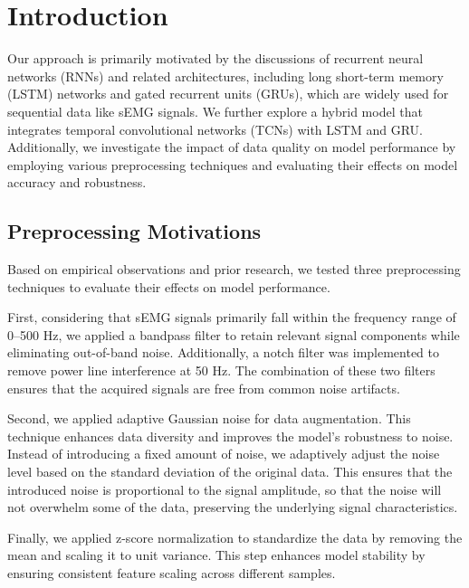 
\section{Introduction}
Our approach is primarily motivated by the discussions of recurrent neural networks (RNNs) and related architectures, 
including long short-term memory (LSTM) networks and gated recurrent units (GRUs), 
which are widely used for sequential data like sEMG signals. 
We further explore a hybrid model that integrates temporal convolutional networks (TCNs) with LSTM and GRU. 
Additionally, we investigate the impact of data quality on model performance by employing various preprocessing techniques 
and evaluating their effects on model accuracy and robustness.

\subsection{Preprocessing Motivations}
Based on empirical observations and prior research, 
we tested three preprocessing techniques to evaluate their effects on model performance.

First, considering that sEMG signals primarily fall within the frequency range of 0--500 Hz, 
we applied a bandpass filter to retain relevant signal components while eliminating out-of-band noise. 
Additionally, a notch filter was implemented to remove power line interference at 50 Hz. 
The combination of these two filters ensures that the acquired signals are free from common noise artifacts.

Second, we applied adaptive Gaussian noise for data augmentation. 
This technique enhances data diversity and improves the model's robustness to noise. 
Instead of introducing a fixed amount of noise, we adaptively adjust the noise level 
based on the standard deviation of the original data. 
This ensures that the introduced noise is proportional to the signal amplitude, 
so that the noise will not overwhelm some of the data, preserving the underlying signal characteristics.

Finally, we applied z-score normalization to standardize the data by removing the mean and scaling it to unit variance. 
This step enhances model stability by ensuring consistent feature scaling across different samples.

